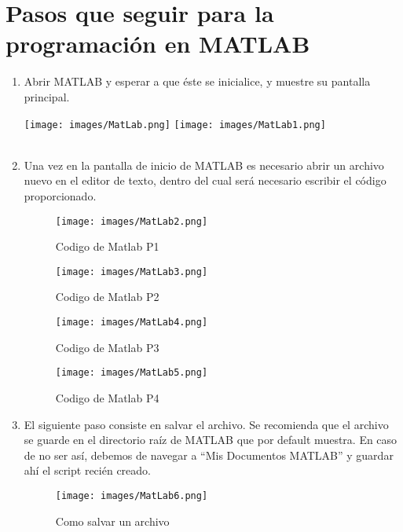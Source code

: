 \documentclass{article}
\begin{document}
\section{Pasos que seguir para la programación en MATLAB}
\begin{enumerate}
\item   Abrir MATLAB y esperar a que éste se inicialice, y muestre su pantalla principal. 

\texttt{[image: images/MatLab.png]} %
\texttt{[image: images/MatLab1.png]} %
\\
\\
\newpage
\item   Una vez en la pantalla de inicio de MATLAB es necesario abrir un archivo nuevo en el editor de texto, dentro del cual será necesario escribir el código proporcionado.

\begin{figure}[h] %
    \centering
    \texttt{[image: images/MatLab2.png]} %
    \caption{Codigo de Matlab P1}
\end{figure}

\begin{figure}[h] %
    \centering
    \texttt{[image: images/MatLab3.png]} %
    \caption{Codigo de Matlab P2}
\end{figure}

\newpage

\begin{figure}[h] %
    \centering
    \texttt{[image: images/MatLab4.png]} %
    \caption{Codigo de Matlab P3}
\end{figure}

\begin{figure}[h] %
    \centering
    \texttt{[image: images/MatLab5.png]} %
    \caption{Codigo de Matlab P4}
\end{figure}

\newpage

\item   El siguiente paso consiste en salvar el archivo. Se recomienda que el archivo se guarde en el directorio raíz de MATLAB que por default muestra. En caso de no ser así, debemos de navegar a “Mis Documentos  MATLAB” y guardar ahí el script recién creado. 

\begin{figure}[h] %
    \centering
    \texttt{[image: images/MatLab6.png]} %
    \caption{Como salvar un archivo}
\end{figure}



\end{enumerate}
\end{document}
